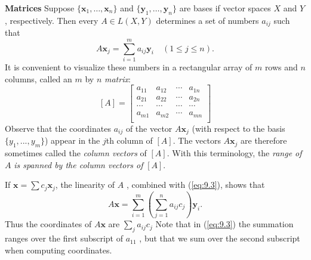 \begin{myDef}
    \textbf{Matrices} 
    Suppose $\{\mathbf{x}_1, \dots , \mathbf{x}_n\}$ 
    and $\{\mathbf{y}_1, \dots , \mathbf{y}_n\}$ are bases if vector spaces $X$ and $Y$, respectively.
    Then every $A \in L(X, Y)$ determines a set of numbers $a_{ij}$ such that 
    \begin{equation}
        \label{eq:9.3}
        A \mathbf{x}_j = 
        \sum_{i=1}^{m} a_{ij} \mathbf{y}_i
        \quad 
        (1 \leq j \leq n).
    \end{equation}
    It is convenient to visualize these numbers in a rectangular array of $m$ rows and $n$ columns, called an $m$ by $n$ \emph{matrix}:
    \begin{equation*}
        \left[ A \right] = 
        \begin{bmatrix}
            a_{11} & a_{12} & \cdots & a_{1n} \\
            a_{21} & a_{22} & \cdots & a_{2n} \\
            \cdots & \cdots & \cdots & \cdots \\
            a_{m1} & a_{m2} & \cdots & a_{mn} \\
        \end{bmatrix}
    \end{equation*}
    Observe that the coordinates $a_{ij}$ of the vector $A \mathbf{x}_j$ 
    (with respect to the basis $\{y_1, ... , y_m\}$) appear in the $j$th column of $[A]$. 
    The vectors $A \mathbf{x}_j$ are therefore sometimes called the \emph{column vectors} of $[A]$. 
    With this terminology, the \emph{range of} $A$ \emph{is spanned by the column vectors of} $[A]$.

    If $\mathbf{x} = \sum c_j \mathbf{x}_j$, the linearity of $A$ , combined with (\ref{eq:9.3}), shows that 
    \begin{equation}
        \label{eq:9.4}
        A \mathbf{x} = 
        \sum_{i=1}^{m} \left( 
            \sum_{j=1}^{n} a_{ij} c_j
         \right) 
         \mathbf{y}_i .
    \end{equation}
    Thus the coordinates of $A \mathbf{x}$ are $\sum_j a_{ij} c_j$ 
    Note that in (\ref{eq:9.3}) the summation ranges over the first subscript of $a_{11}$ , 
    but that we sum over the second subscript when computing coordinates.
\end{myDef}
